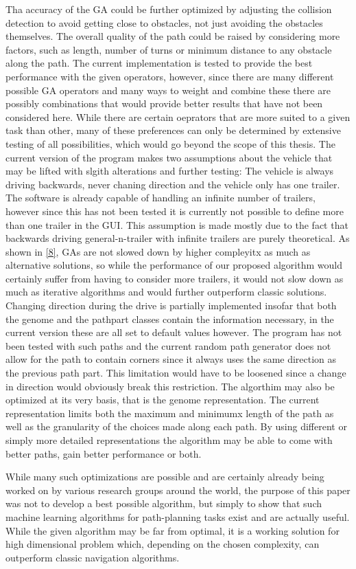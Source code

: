 Tha accuracy of the GA could be further optimized by adjusting the collision detection to avoid getting close to obstacles, not just avoiding the obstacles themselves. The overall quality of the path could be raised by considering more factors, such as length, number of turns or minimum distance to any obstacle along the path.
The current implementation is tested to provide the best performance with the given operators, however, since there are many different possible GA operators and many ways to weight and combine these there are possibly combinations that would provide better results that have not been considered here. While there are certain oeprators that are more suited to a given task than other, many of these preferences can only be determined by extensive testing of all possibilities, which would go beyond the scope of this thesis.
The current version of the program makes two assumptions about the vehicle that may be lifted with slgith alterations and further testing: The vehicle is always driving backwards, never chaning direction and the vehicle only has one trailer. The software is already capable of handling an infinite number of trailers, however since this has not been tested it is currently not possible to define more than one trailer in the GUI. This assumption is made mostly due to the fact that backwards driving general-n-trailer with infinite trailers are purely theoretical. As shown in \ref{8}, GAs are not slowed down by higher compleyitx as much as alternative solutions, so while the performance of our proposed algorithm would certainly suffer from having to consider more trailers, it would not slow down as much as iterative algorithms and would further outperform classic solutions. 
Changing direction during the drive is partially implemented insofar that both the genome and the pathpart classes contain the information necessary, in the current version these are all set to default values however. The program has not been tested with such paths and the current random path generator does not allow for the path to contain corners since it always uses the same direction as the previous path part. This limitation would have to be loosened since a change in direction would obviously break this restriction.
The algorthim may also be optimized at its very basis, that is the genome representation. The current representation limits both the maximum and minimumx length of the path as well as the granularity of the choices made along each path. By using different or simply more detailed representations the algorithm may be able to come with better paths, gain better performance or both.

While many such optimizations are possible and are certainly already being worked on by various research groups around the world, the purpose of this paper was not to develop a best possible algorithm, but simply to show that such machine learning algorithms for path-planning tasks exist and are actually useful. While the given algorithm may be far from optimal, it is a working solution for high dimensional problem which, depending on the chosen complexity, can outperform classic navigation algorithms.